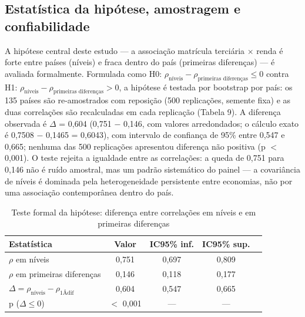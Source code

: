 \documentclass[12pt,a4paper]{article}
\begin{document}
\subsection{Estatística da hipótese, amostragem e confiabilidade}

A hipótese central deste estudo --- a associação matrícula terciária $\times$ renda é forte entre países (níveis) e fraca dentro do país (primeiras diferenças) --- é avaliada formalmente. Formulada como H0: $\rho_{\text{níveis}} - \rho_{\text{primeiras diferenças}} \le 0$ contra H1: $\rho_{\text{níveis}} - \rho_{\text{primeiras diferenças}} > 0$, a hipótese é testada por bootstrap por país: os 135 países são re-amostrados com reposição (500 replicações, semente fixa) e as duas correlações são recalculadas em cada replicação (Tabela 9). A diferença observada é $\Delta$ = 0,604 (0,751 $-$ 0,146, com valores arredondados; o cálculo exato é 0,7508 $-$ 0,1465 = 0,6043), com intervalo de confiança de 95\% entre 0,547 e 0,665; nenhuma das 500 replicações apresentou diferença não positiva (p $<$ 0,001). O teste rejeita a igualdade entre as correlações: a queda de 0,751 para 0,146 não é ruído amostral, mas um padrão sistemático do painel --- a covariância de níveis é dominada pela heterogeneidade persistente entre economias, não por uma associação contemporânea dentro do país.

\begin{table}[htbp]
\centering
\caption{Teste formal da hipótese: diferença entre correlações em níveis e em primeiras diferenças}
\label{tab:hipotese}
\small
\begin{tabular}{>{\raggedright\arraybackslash}p{6.2cm}cccc}
\toprule
Estatística & Valor & IC95\% inf. & IC95\% sup. \\
\midrule
$\rho$ em níveis & 0,751 & 0,697 & 0,809 \\
$\rho$ em primeiras diferenças & 0,146 & 0,118 & 0,177 \\
$\Delta = \rho_{\text{níveis}} - \rho_{\text{1\AA dif}}$ & 0,604 & 0,547 & 0,665 \\
p ($\Delta \le 0$) & $<$ 0,001 & --- & --- \\
\bottomrule
\end{tabular}
\par{}
\end{table}
\end{document}
